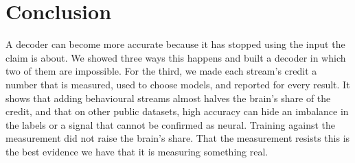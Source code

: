 \section{Conclusion}
\label{sec:conclusion}

A decoder can become more accurate because it has stopped using the input the
claim is about. We showed three ways this happens and built a decoder in which
two of them are impossible. For the third, we made each stream's credit a
number that is measured, used to choose models, and reported for every result.
It shows that adding behavioural streams almost halves the brain's share of the
credit, and that on other public datasets, high accuracy can hide an imbalance
in the labels or a signal that cannot be confirmed as neural. Training against
the measurement did not raise the brain's share. That the measurement resists
this is the best evidence we have that it is measuring something real.
